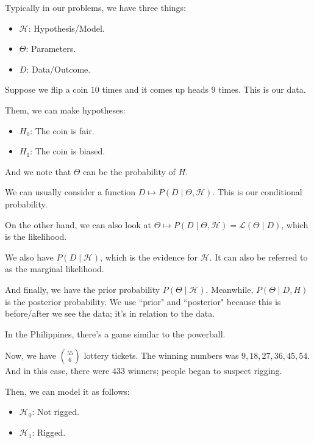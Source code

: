 \documentclass[openany]{book}
\begin{document}
Typically in our problems, we have three things:
\begin{itemize}
	\item $\mathcal H$: Hypothesis/Model.
	\item $\Theta$: Parameters.
	\item $D$: Data/Outcome.
\end{itemize}
\begin{example}
	Suppose we flip a coin $10$ times and it comes up heads $9$ times. This is our data.
	
	Them, we can make hypotheses:
	\begin{itemize}
		\item $H_0$: The coin is fair.
		\item $H_1$: The coin is biased.
	\end{itemize}
	
	And we note that $\Theta$ can be the probability of $H$.
\end{example}

We can usually consider a function $D \mapsto P(D \mid \Theta, \mathcal H)$. This is our conditional probability.

On the other hand, we can also look at $\Theta \mapsto P(D \mid \Theta, \mathcal H) = \mathcal L(\Theta \mid D)$, which is the likelihood.

We also have $P(D \mid \mathcal H)$, which is the evidence for $\mathcal H$. It can also be referred to as the marginal likelihood.

And finally, we have the prior probability $P(\Theta \mid \mathcal H)$. Meanwhile, $P(\Theta \mid D, H)$ is the posterior probability. We use ``prior" and ``posterior" because this is before/after we see the data; it's in relation to the data.

\begin{example}
	In the Philippines, there's a game similar to the powerball.
	
	Now, we have $\binom{55}{6}$ lottery tickets. The winning numbers was $9, 18, 27, 36, 45, 54$. And in this case, there were $433$ winners; people began to suspect rigging.
	
	Then, we can model it as follows:
	\begin{itemize}
		\item $\mathcal H_0$: Not rigged.
		\item $\mathcal H_1$: Rigged.
	\end{itemize}
\end{example}
\end{document}
